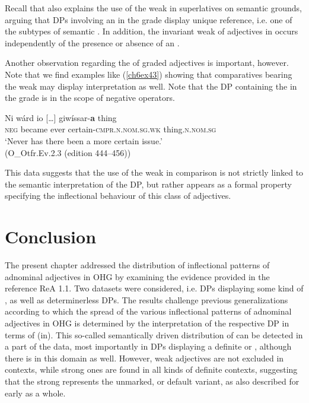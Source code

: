 \documentclass[output=paper,colorlinks,citecolor=brown]{langscibook}
\begin{document}
Recall that \citet[69--70]{Demske01} also explains the use of the weak
 in superlatives on semantic grounds, arguing that DPs
involving an  in the  grade display unique
reference, i.e. one of the subtypes of semantic . In
addition, the invariant weak  of adjectives in 
occurs independently of the presence or absence of an .

Another observation regarding the  of graded adjectives is
important, however. Note that we find examples like (\ref{ch6ex43}) showing that
comparatives bearing the weak  may display 
interpretation as well. Note that the DP containing the  in the
 grade is in the scope of negative operators.

\begin{exe}
\ex\label{ch6ex43}
\gll Ni wárd io {[}\ldots{]} giwíssar-\textbf{a} thing\\
\textsc{neg} became ever {} certain-\textsc{cmpr.n.nom.sg.wk} thing.\textsc{n.nom.sg}\\
\glt `Never has there been a more certain issue.'\\(O\_Otfr.Ev.2.3 (edition 444--456))
\end{exe}

This data suggests that the use of the weak  in comparison is
not strictly linked to the semantic interpretation of the DP, but rather
appears as a formal property specifying the inflectional behaviour of this
class of adjectives.


\section{Conclusion}\label{sec:conc}
The present chapter addressed the distribution of inflectional patterns
of adnominal adjectives in OHG by examining the evidence provided in the
reference  ReA 1.1. Two datasets were considered, i.e. DPs
displaying some kind of , as well as determinerless DPs. The
results challenge previous generalizations according to which the spread
of the various inflectional patterns of adnominal adjectives in OHG is
determined by the interpretation of the respective DP in terms of
(in). This so-called semantically driven distribution of
 can be detected in a part of the data, most
importantly in DPs displaying a definite or  ,
although there is  in this domain as well. However, weak
adjectives are not excluded in  contexts, while strong ones
are found in all kinds of definite contexts, suggesting that the strong
 represents the unmarked, or default variant, as also described
for early  as a whole.
\end{document}
